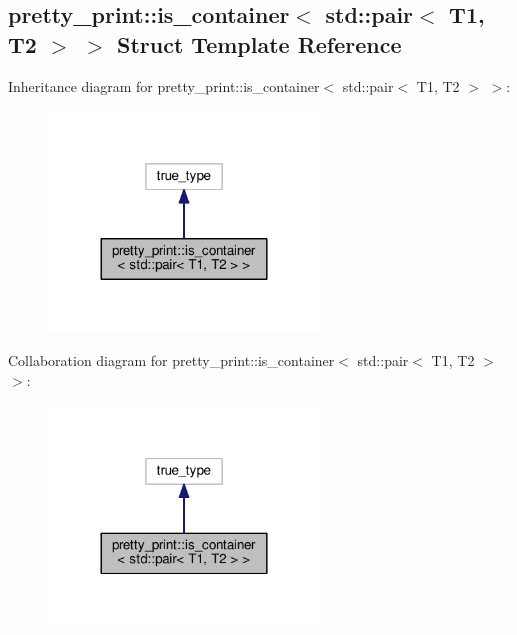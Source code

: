 \hypertarget{structpretty__print_1_1is__container_3_01std_1_1pair_3_01T1_00_01T2_01_4_01_4}{}\subsection{pretty\+\_\+print\+:\+:is\+\_\+container$<$ std\+:\+:pair$<$ T1, T2 $>$ $>$ Struct Template Reference}
\label{structpretty__print_1_1is__container_3_01std_1_1pair_3_01T1_00_01T2_01_4_01_4}


Inheritance diagram for pretty\+\_\+print\+:\+:is\+\_\+container$<$ std\+:\+:pair$<$ T1, T2 $>$ $>$\+:
\nopagebreak
\begin{figure}[H]
\begin{center}
\leavevmode
\includegraphics[width=204pt]{structpretty__print_1_1is__container_3_01std_1_1pair_3_01T1_00_01T2_01_4_01_4__inherit__graph}
\end{center}
\end{figure}


Collaboration diagram for pretty\+\_\+print\+:\+:is\+\_\+container$<$ std\+:\+:pair$<$ T1, T2 $>$ $>$\+:
\nopagebreak
\begin{figure}[H]
\begin{center}
\leavevmode
\includegraphics[width=204pt]{structpretty__print_1_1is__container_3_01std_1_1pair_3_01T1_00_01T2_01_4_01_4__coll__graph}
\end{center}
\end{figure}


